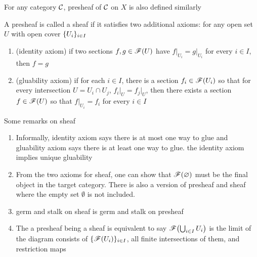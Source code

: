 \begin{remark}
	For any category $\mathcal{C}$, presheaf of $\mathcal{C}$ on $X$ is also defined similarly
\end{remark}

\begin{definition}[sheaf]
	A presheaf is called a sheaf if it satisfies two additional axioms: for any open set $U$ with open cover $\{U_i\}_{i \in I}$
	\begin{enumerate}
		\item (identity axiom) if two sections $f, g \in \mathscr{F}(U)$ have $f\vert_{U_i} = g\vert_{U_i}$ for every $i \in I$, then $f = g$
		
		\item (gluability axiom) if for each $i \in I$, there is a section $f_i \in \mathscr{F}(U_i)$ so that for every intersection $U = U_i \cap U_j$, $f_i\vert_U = f_j\vert_U$, then there exists a section $f \in \mathscr{F}(U)$ so that $f\vert_{U_i} = f_i$ for every $i \in I$
	\end{enumerate}
\end{definition}

\begin{remark}
	Some remarks on sheaf
	\begin{enumerate}
		\item Informally, identity axiom says there is at most one way to glue and gluability axiom says there is at least one way to glue. the identity axiom implies unique gluability
		
		\item From the two axioms for sheaf, one can show that $\mathscr{F}(\varnothing)$ must be the final object in the target category. There is also a version of presheaf and sheaf where the empty set $\emptyset$ is not included.
		
		\item germ and stalk on sheaf is germ and stalk on presheaf
		
		\item The a presheaf being a sheaf is equivalent to say $\ms{F}\tuple*{\bigcup_{i \in I} U_i}$ is the limit of the diagram consists of $\{\mathscr{F}(U_i)\}_{i \in I}$, all finite intersections of them, and restriction maps
		\begin{center}
		\end{center}
	\end{enumerate}
\end{remark}

